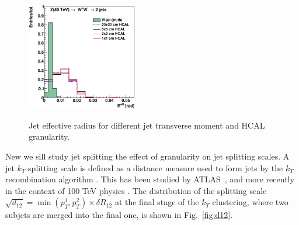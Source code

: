 \begin{figure}
\begin{center}
{   \includegraphics[width=0.43\textwidth]{figs/h40tev_clus_effR_ww1}
   }
\end{center}
\caption{Jet effective radius for different jet transverse moment and HCAL granularity.}
\label{fig:eff_rad}
\end{figure}


New we sill study jet splitting the effect of granularity on jet splitting scales.
A jet $k_T$ splitting scale \cite{Butterworth:2002tt} is defined as a distance measure
used to form jets by the $k_T$ recombination
algorithm \cite{Catani1993187,Ellis:1993tq}.
This has been studied by ATLAS~\cite{ATLAS:2012am}, and more recently in the context of 100 TeV physics \cite{Auerbach:2014xua}.
The distribution of the splitting scale $\sqrt{d_{12}}=\min(p_T^1,p_T^2) \times \delta R_{12}$ \cite{ATLAS:2012am} at the final stage of the $k_T$ clustering, where two subjets are merged into the final one,
is shown in Fig.~\ref{fig:d12}.

